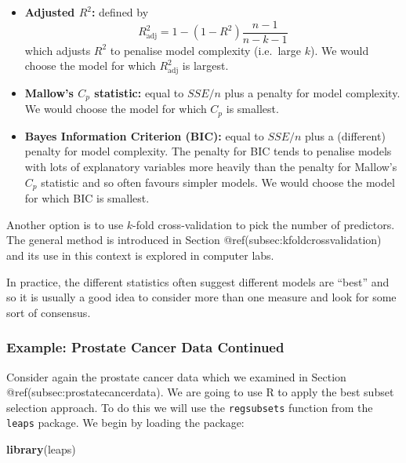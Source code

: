 \documentclass[
]{article}
\newenvironment{Shaded}{\begin{snugshade}}{\end{snugshade}}
\newcommand{\FunctionTok}[1]{\textcolor[rgb]{0.13,0.29,0.53}{\textbf{#1}}}
\newcommand{\NormalTok}[1]{#1}
\providecommand{\tightlist}{%
  \setlength{\itemsep}{0pt}\setlength{\parskip}{0pt}}
\begin{document}
\begin{itemize}
\tightlist
\item
  \textbf{Adjusted \(R^2\):} defined by\\
  \begin{equation*}
  R^2_{\text{adj}} = 1 - (1 - R^2) \frac{n - 1}{n - k - 1}
  \end{equation*} which adjusts \(R^2\) to penalise model complexity
  (i.e.~large \(k\)). We would choose the model for which
  \(R^2_{\text{adj}}\) is largest.
\item
  \textbf{Mallow's \(C_p\) statistic:} equal to \(SSE / n\) plus a
  penalty for model complexity. We would choose the model for which
  \(C_p\) is smallest.
\item
  \textbf{Bayes Information Criterion (BIC):} equal to \(SSE / n\) plus
  a (different) penalty for model complexity. The penalty for BIC tends
  to penalise models with lots of explanatory variables more heavily
  than the penalty for Mallow's \(C_p\) statistic and so often favours
  simpler models. We would choose the model for which BIC is smallest.
\end{itemize}

Another option is to use \(k\)-fold cross-validation to pick the number
of predictors. The general method is introduced in Section
@ref(subsec:kfoldcrossvalidation) and its use in this context is
explored in computer labs.

In practice, the different statistics often suggest different models are
``best'' and so it is usually a good idea to consider more than one
measure and look for some sort of consensus.

\hypertarget{subsubsec:prostatecancerdatabss}{%
\subsubsection{Example: Prostate Cancer Data
Continued}\label{subsubsec:prostatecancerdatabss}}

Consider again the prostate cancer data which we examined in Section
@ref(subsec:prostatecancerdata). We are going to use R to apply the best
subset selection approach. To do this we will use the
\texttt{regsubsets} function from the \texttt{leaps} package. We begin
by loading the package:

\begin{Shaded}
\begin{Highlighting}[]
\FunctionTok{library}\NormalTok{(leaps)}
\end{Highlighting}
\end{Shaded}
\end{document}
